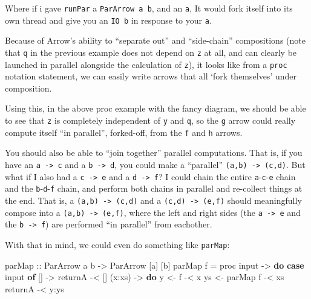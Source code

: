 \documentclass[]{article}
\newenvironment{Shaded}{\begin{snugshade}}{\end{snugshade}}
\newcommand{\DataTypeTok}[1]{\textcolor[rgb]{0.13,0.29,0.53}{#1}}
\newcommand{\FunctionTok}[1]{\textcolor[rgb]{0.00,0.00,0.00}{#1}}
\newcommand{\KeywordTok}[1]{\textcolor[rgb]{0.13,0.29,0.53}{\textbf{#1}}}
\newcommand{\NormalTok}[1]{#1}
\newcommand{\OtherTok}[1]{\textcolor[rgb]{0.56,0.35,0.01}{#1}}
\begin{document}
Where if i gave \texttt{runPar} a \texttt{ParArrow\ a\ b}, and an \texttt{a}, It
would fork itself into its own thread and give you an \texttt{IO\ b} in response
to your \texttt{a}.

Because of Arrow's ability to ``separate out'' and ``side-chain'' compositions
(note that \texttt{q} in the previous example does not depend on \texttt{z} at
all, and can clearly be launched in parallel alongside the calculation of
\texttt{z}), it looks like from a \texttt{proc} notation statement, we can
easily write arrows that all `fork themselves' under composition.

Using this, in the above proc example with the fancy diagram, we should be able
to see that \texttt{z} is completely independent of \texttt{y} and \texttt{q},
so the \texttt{g} arrow could really compute itself ``in parallel'', forked-off,
from the \texttt{f} and \texttt{h} arrows.

You should also be able to ``join together'' parallel computations. That is, if
you have an \texttt{a\ -\textgreater{}\ c} and a \texttt{b\ -\textgreater{}\ d},
you could make a ``parallel'' \texttt{(a,b)\ -\textgreater{}\ (c,d)}. But what
if I also had a \texttt{c\ -\textgreater{}\ e} and a
\texttt{d\ -\textgreater{}\ f}? I could chain the entire
\texttt{a}-\texttt{c}-\texttt{e} chain and the \texttt{b}-\texttt{d}-\texttt{f}
chain, and perform both chains in parallel and re-collect things at the end.
That is, a \texttt{(a,b)\ -\textgreater{}\ (c,d)} and a
\texttt{(c,d)\ -\textgreater{}\ (e,f)} should meaningfully compose into a
\texttt{(a,b)\ -\textgreater{}\ (e,f)}, where the left and right sides (the
\texttt{a\ -\textgreater{}\ e} and the \texttt{b\ -\textgreater{}\ f}) are
performed ``in parallel'' from eachother.

With that in mind, we could even do something like \texttt{parMap}:

\begin{Shaded}
\begin{Highlighting}[]
\OtherTok{parMap ::} \DataTypeTok{ParArrow}\NormalTok{ a b }\OtherTok{->} \DataTypeTok{ParArrow}\NormalTok{ [a] [b]}
\NormalTok{parMap f }\FunctionTok{=}\NormalTok{ proc input }\OtherTok{->} \KeywordTok{do}
    \KeywordTok{case}\NormalTok{ input }\KeywordTok{of}
\NormalTok{      []     }\OtherTok{->}
\NormalTok{          returnA        }\FunctionTok{-<}\NormalTok{ []}
\NormalTok{      (x}\FunctionTok{:}\NormalTok{xs) }\OtherTok{->} \KeywordTok{do}
\NormalTok{          y  }\OtherTok{<-}\NormalTok{ f        }\FunctionTok{-<}\NormalTok{ x}
\NormalTok{          ys }\OtherTok{<-}\NormalTok{ parMap f }\FunctionTok{-<}\NormalTok{ xs}
\NormalTok{          returnA        }\FunctionTok{-<}\NormalTok{ y}\FunctionTok{:}\NormalTok{ys}
\end{Highlighting}
\end{Shaded}
\end{document}
